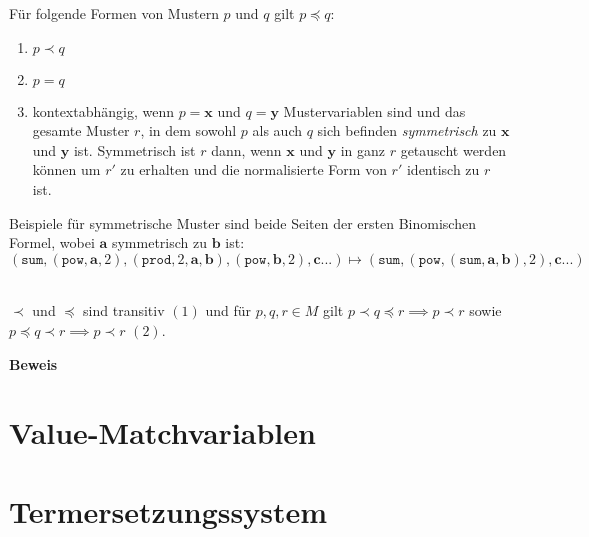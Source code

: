 

Für folgende Formen von Mustern $p$ und $q$ gilt $p \preceq q$:
\begin{enumerate}
	\item{$p \prec q$}
	
	\item{$p = q$}
	
	\item{kontextabhängig, wenn $p = \mathbf x$ und $q = \mathbf y$ Mustervariablen sind und das gesamte Muster $r$, in dem sowohl $p$ als auch $q$ sich befinden \emph{symmetrisch} zu $\mathbf x$ und $\mathbf y$ ist. Symmetrisch ist $r$ dann, wenn $\mathbf x$ und $\mathbf y$ in ganz $r$ getauscht werden können um $r'$ zu erhalten und die normalisierte Form von $r'$ identisch zu $r$ ist.}
\end{enumerate}


Beispiele für symmetrische Muster sind beide Seiten der ersten Binomischen Formel, wobei $\mathbf a$ symmetrisch zu $\mathbf b$ ist:
$$(\texttt{sum}, (\texttt{pow}, \mathbf a, 2), (\texttt{prod}, 2, \mathbf a, \mathbf b), (\texttt{pow}, \mathbf b, 2), \mathbf {c...}) \mapsto (\texttt{sum}, (\texttt{pow}, (\texttt{sum}, \mathbf a, \mathbf b), 2), \mathbf {c...})$$


\begin{lemma}\label{lemTransitivStark}~\\
$\prec$ und $\preceq$ sind transitiv $(1)$ und für $p, q, r \in M$  gilt $p \prec q \preceq r \implies p \prec r$ sowie $p \preceq q \prec r \implies p \prec r$ $(2)$. 
\end{lemma}

\textbf{Beweis}~\\

\section{Value-Matchvariablen}




\section{Termersetzungssystem} \label{subsecTermersetzungssystem}

